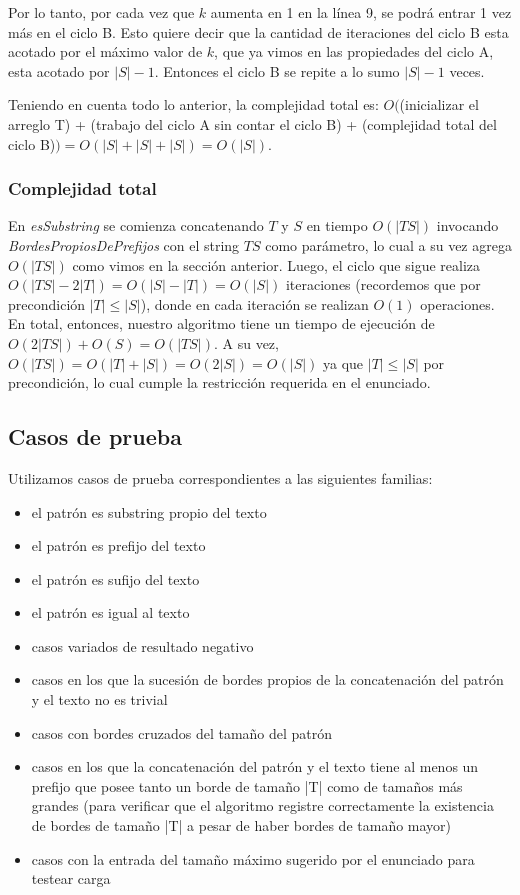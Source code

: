 Por lo tanto, por cada vez que $k$ aumenta en 1 en la línea 9, se podrá entrar 1 vez más en el ciclo B. Esto
quiere decir que la cantidad de iteraciones del ciclo B esta acotado por el máximo valor de $k$, que ya
vimos en las propiedades del ciclo A, esta acotado por $|S|-1$. Entonces el ciclo B se repite a lo sumo $|S|-1$
veces.

Teniendo en cuenta todo lo anterior, la complejidad total es:
$O($(inicializar el arreglo T) + (trabajo del ciclo A sin contar el ciclo B) + (complejidad total del ciclo B)$)
= O(|S| + |S| + |S|) = O(|S|)$.

\subsubsection{Complejidad total}

En \textit{esSubstring} se comienza concatenando $T$ y $S$ en tiempo $O(|TS|)$ invocando \textit{BordesPropiosDePrefijos} con el string $TS$ como parámetro, lo cual a su vez agrega $O(|TS|)$ como vimos en la sección anterior. Luego, el ciclo que sigue realiza $O(|TS|-2|T|) = O(|S|-|T|) = O(|S|)$ iteraciones (recordemos que por precondición $|T| \leq |S|$), donde en cada iteración se realizan $O(1)$ operaciones. En total, entonces, nuestro algoritmo tiene un tiempo de ejecución de $O(2|TS|) + O(S) = O(|TS|)$. A su vez, $O(|TS|) = O(|T|+|S|) = O(2|S|) = O(|S|)$ ya que $|T| \leq |S|$ por precondición, lo cual cumple la restricción requerida en el enunciado.

\subsection{Casos de prueba}

Utilizamos casos de prueba correspondientes a las siguientes familias:
\begin{itemize}
\item el patrón es substring propio del texto
\item el patrón es prefijo del texto
\item el patrón es sufijo del texto
\item el patrón es igual al texto
\item casos variados de resultado negativo
\item casos en los que la sucesión de bordes propios de la concatenación del patrón y el texto no es trivial
\item casos con bordes cruzados del tamaño del patrón
\item casos en los que la concatenación del patrón y el texto tiene al menos un prefijo que posee tanto un borde de tamaño |T| como de tamaños más grandes (para verificar que el algoritmo registre correctamente la existencia de bordes de tamaño |T| a pesar de haber bordes de tamaño mayor)
\item casos con la entrada del tamaño máximo sugerido por el enunciado para testear carga
\end{itemize}


